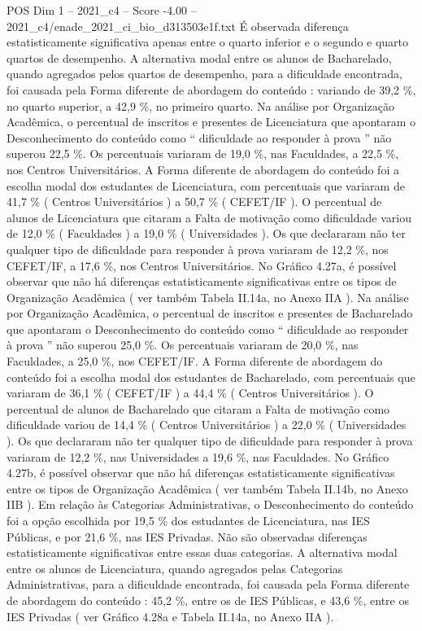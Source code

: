 \begin{textsample}{POS Dim 1 – 2021\_c4 – Score -4.00 – 2021\_c4/enade\_2021\_ci\_bio\_d313503e1f.txt}
É observada diferença estatisticamente significativa apenas entre o quarto inferior e o segundo e quarto quartos de desempenho.
A alternativa modal entre os alunos de Bacharelado, quando agregados pelos quartos de desempenho, para a dificuldade encontrada, foi causada pela Forma diferente de abordagem do conteúdo : variando de 39,2 \%, no quarto superior, a 42,9 \%, no primeiro quarto.
Na análise por Organização Acadêmica, o percentual de inscritos e presentes de Licenciatura que apontaram o Desconhecimento do conteúdo como “ dificuldade ao responder à prova ” não superou 22,5 \%.
Os percentuais variaram de 19,0 \%, nas Faculdades, a 22,5 \%, nos Centros Universitários.
A Forma diferente de abordagem do conteúdo foi a escolha modal dos estudantes de Licenciatura, com percentuais que variaram de 41,7 \% ( Centros Universitários ) a 50,7 \% ( CEFET/IF ).
O percentual de alunos de Licenciatura que citaram a Falta de motivação como dificuldade variou de 12,0 \% ( Faculdades ) a 19,0 \% ( Universidades ).
Os que declararam não ter qualquer tipo de dificuldade para responder à prova variaram de 12,2 \%, nos CEFET/IF, a 17,6 \%, nos Centros Universitários.
No Gráfico 4.27a, é possível observar que não há diferenças estatisticamente significativas entre os tipos de Organização Acadêmica ( ver também Tabela II.14a, no Anexo IIA ).
Na análise por Organização Acadêmica, o percentual de inscritos e presentes de Bacharelado que apontaram o Desconhecimento do conteúdo como “ dificuldade ao responder à prova ” não superou 25,0 \%.
Os percentuais variaram de 20,0 \%, nas Faculdades, a 25,0 \%, nos CEFET/IF.
A Forma diferente de abordagem do conteúdo foi a escolha modal dos estudantes de Bacharelado, com percentuais que variaram de 36,1 \% ( CEFET/IF ) a 44,4 \% ( Centros Universitários ).
O percentual de alunos de Bacharelado que citaram a Falta de motivação como dificuldade variou de 14,4 \% ( Centros Universitários ) a 22,0 \% ( Universidades ).
Os que declararam não ter qualquer tipo de dificuldade para responder à prova variaram de 12,2 \%, nas Universidades a 19,6 \%, nas Faculdades.
No Gráfico 4.27b, é possível observar que não há diferenças estatisticamente significativas entre os tipos de Organização Acadêmica ( ver também Tabela II.14b, no Anexo IIB ).
Em relação às Categorias Administrativas, o Desconhecimento do conteúdo foi a opção escolhida por 19,5 \% dos estudantes de Licenciatura, nas IES Públicas, e por 21,6 \%, nas IES Privadas.
Não são observadas diferenças estatisticamente significativas entre essas duas categorias.
A alternativa modal entre os alunos de Licenciatura, quando agregados pelas Categorias Administrativas, para a dificuldade encontrada, foi causada pela Forma diferente de abordagem do conteúdo : 45,2 \%, entre os de IES Públicas, e 43,6 \%, entre os IES Privadas ( ver Gráfico 4.28a e Tabela II.14a, no Anexo IIA ).

\end{textsample}
